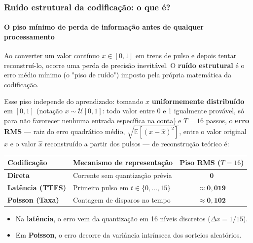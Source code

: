 \begin{frame}
	\frametitle{Ruído estrutural da codificação: o que é?}
	\framesubtitle{O piso mínimo de perda de informação antes de qualquer processamento}
	\small
	\par Ao converter um valor contínuo $x \in [0, 1]$ em trens de pulso e depois tentar reconstruí-lo, ocorre uma perda de precisão inevitável. O \textbf{ruído estrutural} é o erro médio mínimo (o "piso de ruído") imposto pela própria matemática da codificação.
	\par Esse piso independe do aprendizado: tomando $x$ \textbf{uniformemente distribuído} em $[0,1]$ (notação $x \sim \mathcal{U}[0,1]$: todo valor entre 0 e 1 igualmente provável, só para não favorecer nenhuma entrada específica na conta) e $T=16$ passos, o \textbf{erro RMS} --- raiz do erro quadrático médio, $\sqrt{\mathbb{E}[(x-\hat{x})^2]}$, entre o valor original $x$ e o valor $\hat x$ reconstruído a partir dos pulsos --- de reconstrução teórico é:
	\begin{center}
		\footnotesize
		\begin{tabular}{llc}
			\toprule
			\textbf{Codificação} & \textbf{Mecanismo de representação} & \textbf{Piso RMS ($T=16$)} \\
			\midrule
			\textbf{Direta} & Corrente sem quantização prévia & $\mathbf{0}$ \\
			\textbf{Latência (TTFS)} & Primeiro pulso em $t \in \{0,\dots,15\}$ & $\approx \mathbf{0{,}019}$ \\
			\textbf{Poisson (Taxa)} & Contagem de disparos no tempo & $\approx \mathbf{0{,}102}$ \\
			\bottomrule
		\end{tabular}
	\end{center}
	\begin{itemize}
		\setlength{\itemsep}{1pt}
		\item Na \textbf{latência}, o erro vem da quantização em 16 níveis discretos ($\Delta x = 1/15$).
		\item Em \textbf{Poisson}, o erro decorre da variância intrínseca dos sorteios aleatórios.
	\end{itemize}
\end{frame}

